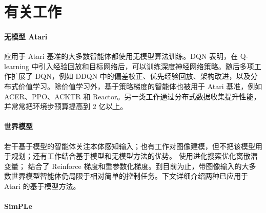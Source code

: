 \section{有关工作}

\paragraph{无模型 Atari}

应用于 Atari 基准的大多数智能体都使用无模型算法训练。DQN \citep{mnih2015dqn} 表明，在 Q-learning 中引入经验回放和目标网络后，可以训练深度神经网络策略。随后多项工作扩展了 DQN，例如 DDQN 中的偏差校正\citep{van2015ddqn}、优先经验回放\citep{schaul2015prioritizedreplay}、架构改进\citep{wang2016duelingdqn}，以及分布式价值学习\citep{bellemare2017c51,dabney2017qrdqn,dabney2018iqn}。除价值学习外，基于策略梯度的智能体也被用于 Atari 基准，例如 ACER\citep{schulman2017ppo}、PPO\citep{schulman2017ppo}、ACKTR\citep{wu2017acktr} 和 Reactor\citep{gruslys2017reactor}。另一类工作通过分布式数据收集提升性能，并常常把环境步预算提高到 2 亿以上\citep{mnih2016a3c,schulman2017proximal,horgan2018apex,kapturowski2018r2d2,badia2020agent57}。

\paragraph{世界模型}

若干基于模型的智能体关注本体感知输入\citep{watter2015e2c,gal2016deeppilco,higuera2018synthesizing,henaff2018planbybackprop,chua2018pets,tingwu2019benchmark,wang2019poplin}；也有工作对图像建模，但不把该模型用于规划\citep{oh2015atari,krishnan2015deepkalman,karl2016dvbf,chiappa2017recenvsim,babaeizadeh2017sv2p,gemici2017temporalmemory,denton2018stochastic,buesing2018dssm,doerr2018prssm,gregor2018tdvae}；还有工作结合基于模型和无模型方法的优势\citep{kalweit2017blending,nagabandi2017mbmf,weber2017i2a,kurutach2018modeltrpo,buckman2018steve,ha2018worldmodels,wayne2018merlin,igl2018dvrl,srinivas2018upn,lee2019slac}。\citet{risi2019discrete} 使用进化搜索优化离散潜变量；\citet{parmas2019pipps} 结合了 Reinforce 梯度和重参数化梯度。到目前为止，带图像输入的大多数世界模型智能体仍局限于相对简单的控制任务\citep{watter2015e2c,ebert2017visualmpc,ha2018worldmodels,hafner2018planet,zhang2018solar,hafner2019dreamer}。下文详细介绍两种已应用于 Atari 的基于模型方法。



\paragraph{SimPLe}

